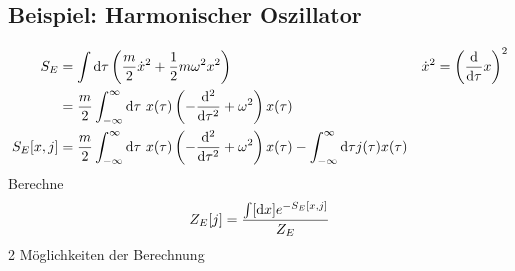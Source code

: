 \subsection{Beispiel: Harmonischer Oszillator}
	\begin{align*}
		S_E &= \int \mathrm{d} \tau \left(\frac{m}{2} \dot{x}^2 + \frac{1}{2} m \omega^2 x^2\right)
		& &\dot{x}^2 = \left(\frac{\mathrm{d}}{\mathrm{d} \tau} x \right)^2\\
		&= \frac{m}{2} \int_{-\infty}^\infty \mathrm{d} \tau ~x(\tau) \left(- \frac{\mathrm{d}^2}{\mathrm{d} \tau^2} + \omega^2\right) x(\tau) \\
		S_E [x, j] &= \frac{m}{2} \int_{-\infty}^\infty \mathrm{d} \tau ~x(\tau)
		\left(- \frac{\mathrm{d}^2}{\mathrm{d} \tau^2} + \omega^2\right) x(\tau)
		- \int_{-\infty}^\infty \mathrm{d} \tau j(\tau) x(\tau)
	\end{align*}
Berechne 
	\begin{align*}
		Z_E [j] = \frac{\int [\mathrm{d} x] e^{-S_E[x, j]}}{Z_E} 
	\end{align*}
2 Möglichkeiten der Berechnung	
